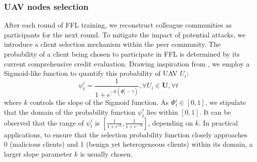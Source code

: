 \documentclass[lettersize,journal]{IEEEtran}
\begin{document}
\subsubsection{UAV nodes selection}
After each round of FFL training, we reconstruct colleague communities as participants for the next round. To mitigate the impact of potential attacks, we introduce a client selection mechanism within the peer community. The probability of a client being chosen to participate in FFL is determined by its current comprehensive credit evaluation. Drawing inspiration from \cite{zhou2022defta}, we employ a Sigmoid-like function to quantify this probability of UAV $U_i$:
\begin{equation}
\psi^{i}_t=\frac{1}{1+e^{-k (\Phi^{i}_{t}-\gamma)}},\forall U_i \in \mathbf{U}, \forall t
\end{equation}
where $k$ controls the slope of the Sigmoid function. As $\Phi^{i}_{t}\in [0,1]$, we stipulate that the domain of the probability function $\psi^{i}_t$ lies within $[0,1]$. It can be observed that the range of $\psi^{i}_t$ is $[\frac{1}{1+e^{\gamma k}},\frac{1}{1+e^{-\gamma k}}]$, depending on $k$. In practical applications, to ensure that the selection probability function closely approaches 0 (malicious clients) and 1 (benign yet heterogeneous clients) within its domain, a larger slope parameter $k$ is usually chosen.
\end{document}
